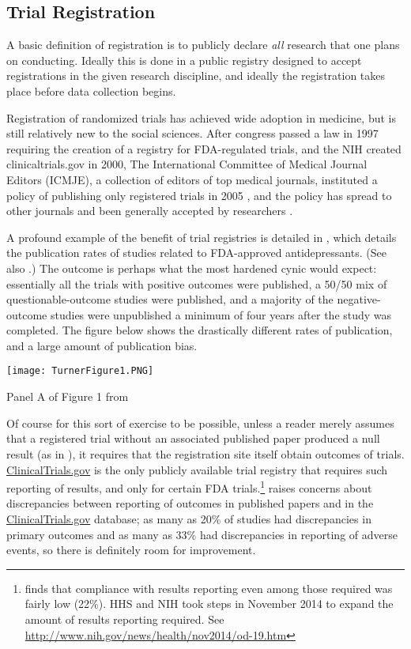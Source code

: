 \documentclass[12pt] {article}
\begin{document}
\subsection{Trial Registration}\label{trial-registration}

A basic definition of registration is to publicly declare \emph{all}
research that one plans on conducting. Ideally this is done in a public
registry designed to accept registrations in the given research discipline,
and ideally the registration takes place before data collection begins.

Registration of randomized trials has achieved wide adoption in medicine, but is still
relatively new to the social sciences. After congress passed a law in
1997 requiring the creation of a registry for FDA-regulated trials, and
the NIH created clinicaltrials.gov in 2000, The International Committee
of Medical Journal Editors (ICMJE), a collection of editors of top
medical journals, instituted a policy of publishing only registered
trials in 2005 \citep{DeAngelis2004}, and the policy has spread to
other journals and been generally accepted by researchers \citep{laine_clinical_2007}.

A profound example of the benefit of trial registries is detailed in
\cite{turner_selective_2008}, which details the publication rates of studies
related to FDA-approved antidepressants. (See also \cite{ioannidis_effectiveness_2008}.)
The outcome is perhaps what the most hardened cynic would expect:
essentially all the trials with positive outcomes were published, a
50/50 mix of questionable-outcome studies were published, and a majority of the
negative-outcome studies were unpublished a minimum of four years after the
study was completed. The figure below shows the drastically different
rates of publication, and a large amount of publication bias.
\begin{center}
\texttt{[image: TurnerFigure1.PNG]}

Panel A of Figure 1 from \cite{turner_selective_2008}
\end{center}
Of course for this sort of exercise to be possible, unless a reader
merely assumes that a registered trial without an associated published
paper produced a null result (as in \cite{rosenthal1979file}), it requires that the registration site
itself obtain outcomes of trials. \href{http://www.clinicaltrials.gov}{ClinicalTrials.gov} is the only
publicly available trial registry that requires such reporting of
results, and only for certain FDA trials.\footnote{\cite{resultscompliance} finds that compliance with results reporting even among those required was fairly low (22\%). HHS and NIH took steps in November 2014 to expand the amount of results reporting required. See \url{http://www.nih.gov/news/health/nov2014/od-19.htm}}  \cite{hartung_reporting_2014} raises
concerns about discrepancies between reporting of outcomes in published
papers and in the \href{http://www.clinicaltrials.gov}{ClinicalTrials.gov} database; as many as 20\% of
studies had discrepancies in primary outcomes and as many as 33\% had
discrepancies in reporting of adverse events, so there is definitely room for improvement. 
\end{document}
